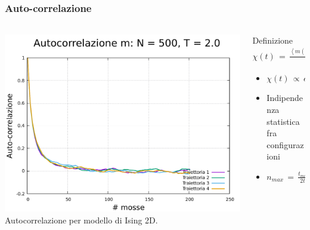 \begin{frame}
    \frametitle{Auto-correlazione}
    \framesubtitle{}

    \begin{columns}

        \begin{column}{0.55\textwidth}

            \centering
            \includegraphics[width=\textwidth]{Immagini/metodiNumerici/auto_500_2.0.pdf}
            \newline
            {\scriptsize Autocorrelazione per modello di Ising 2D.}

        \end{column}


        \begin{column}{0.45\textwidth}

            \begin{block}{Definizione}
                \centering
                $\chi\left(t\right)\,=\,\frac{\left<m\left(t'\right)m\left(t'\,+\,t\right)\right>_{t'}\,-\,\left<m\right>^2}{\sigma^2_m}$
            \end{block}

            \vspace{0.7cm}

            \begin{itemize}[itemsep=0.5em, label=$\diamond$]
                \item $\chi\left(t\right)\,\propto\,e^{-t/t_c}$
                \item Indipendenza statistica fra configurazioni
                \item $n_{max}\,=\,\frac{t_{max}}{2t_c}$
            \end{itemize}
            
        \end{column}
      \end{columns}
  
\end{frame}



